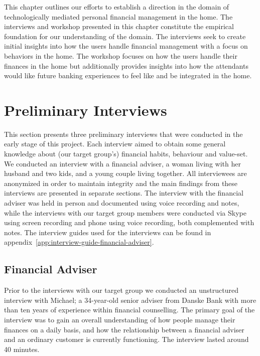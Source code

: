 This chapter outlines our efforts to establish a direction in the domain of technologically mediated personal financial management in the home. The interviews and workshop presented in this chapter constitute the empirical foundation for our understanding of the domain. The interviews seek to create initial insights into how the users handle financial management with a focus on behaviors in the home. The workshop focuses on how the users handle their finances in the home but additionally provides insights into how the attendants would like future banking experiences to feel like and be integrated in the home.

\section{Preliminary Interviews}
This section presents three preliminary interviews that were conducted in the early stage of this project. Each interview aimed to obtain some general knowledge about (our target group’s) financial habits, behaviour and value-set. We conducted an interview with a financial adviser, a woman living with her husband and two kids, and a young couple living together. All interviewees are anonymized in order to maintain integrity and the main findings from these interviews are presented in separate sections. The interview with the financial adviser was held in person and documented using voice recording and notes, while the interviews with our target group members were conducted via Skype using screen recording and phone using voice recording, both complemented with notes. The interview guides used for the interviews can be found in appendix~\ref{app:interview-guide-financial-adviser}.

\subsection{Financial Adviser}
Prior to the interviews with our target group we conducted an unstructured interview \cite[chapter~7]{sharp2007interaction} with Michael; a 34-year-old senior adviser from Danske Bank with more than ten years of experience within financial counselling. The primary goal of the interview was to gain an overall understanding of how people manage their finances on a daily basis, and how the relationship between a financial adviser and an ordinary customer is currently functioning. The interview lasted around 40 minutes.

